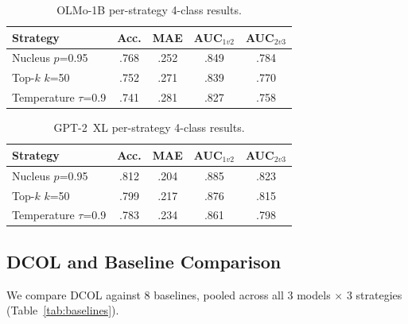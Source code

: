 \documentclass[11pt,a4paper]{article}
\begin{document}
\begin{table}[t]
\centering
\small
\caption{OLMo-1B per-strategy 4-class results.}
\label{tab:olmo_strategy}
\begin{tabular}{@{}lcccc@{}}
\toprule
\textbf{Strategy} & \textbf{Acc.} & \textbf{MAE} & \textbf{AUC$_{1v2}$} & \textbf{AUC$_{2v3}$} \\
\midrule
Nucleus $p$=0.95 & .768 & .252 & .849 & .784 \\
Top-$k$ $k$=50 & .752 & .271 & .839 & .770 \\
Temperature $\tau$=0.9 & .741 & .281 & .827 & .758 \\
\bottomrule
\end{tabular}
\end{table}

\begin{table}[t]
\centering
\small
\caption{GPT-2~XL per-strategy 4-class results.}
\label{tab:gpt2_strategy}
\begin{tabular}{@{}lcccc@{}}
\toprule
\textbf{Strategy} & \textbf{Acc.} & \textbf{MAE} & \textbf{AUC$_{1v2}$} & \textbf{AUC$_{2v3}$} \\
\midrule
Nucleus $p$=0.95 & .812 & .204 & .885 & .823 \\
Top-$k$ $k$=50 & .799 & .217 & .876 & .815 \\
Temperature $\tau$=0.9 & .783 & .234 & .861 & .798 \\
\bottomrule
\end{tabular}
\end{table}

\subsection{DCOL and Baseline Comparison}
\label{sec:baselines}

We compare DCOL against 8 baselines, pooled across all 3 models $\times$ 3 strategies (Table~\ref{tab:baselines}).
\end{document}
